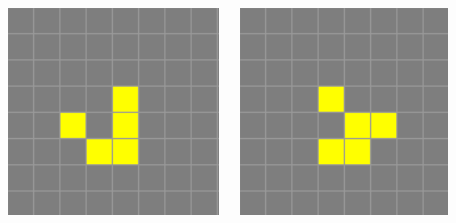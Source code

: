 \documentclass[20pt,margin=2.2cm,innermargin=-4.5in,blockverticalspace=-0.25in]{tikzposter}
\begin{document}
\begin{columns}
{\begin{minipage}[t]{\linewidth}
\begin{minipage}[t]{0.15\linewidth}
            \end{minipage}
            \begin{minipage}[t]{0.15\linewidth}
                \includegraphics[width=\textwidth]{images/life-glider-3.png}
            \end{minipage}
            \begin{minipage}[t]{0.15\linewidth}
                \includegraphics[width=\textwidth]{images/life-glider-4.png}

\end{minipage}
\end{minipage}}
\end{columns}
\end{document}
